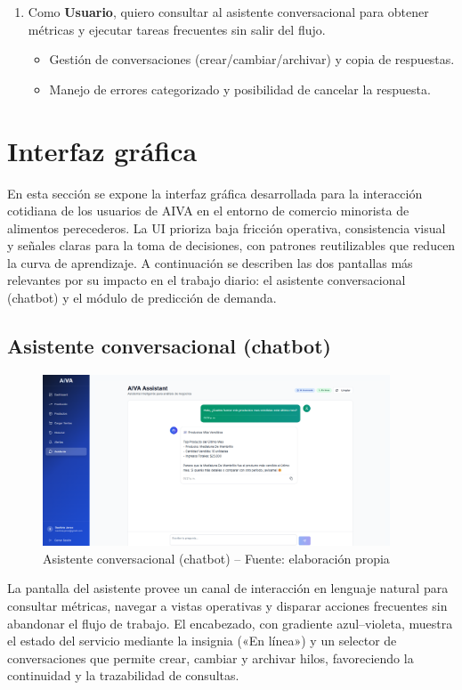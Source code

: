 \begin{enumerate}[label=HU-\arabic*., leftmargin=*, nosep]
\item Como \textbf{Usuario}, quiero consultar al asistente conversacional para obtener métricas y ejecutar tareas frecuentes sin salir del flujo.
\begin{itemize}[nosep]
\item Gestión de conversaciones (crear/cambiar/archivar) y copia de respuestas.
\item Manejo de errores categorizado y posibilidad de cancelar la respuesta.
\end{itemize}


\end{enumerate}


\vspace{1cm}
\section{Interfaz gráfica}
En esta sección se expone la interfaz gráfica desarrollada para la interacción cotidiana de los usuarios de AIVA en el entorno de comercio minorista de alimentos perecederos. La UI prioriza baja fricción operativa, consistencia visual y señales claras para la toma de decisiones, con patrones reutilizables que reducen la curva de aprendizaje. A continuación se describen las dos pantallas más relevantes por su impacto en el trabajo diario: el asistente conversacional (chatbot) y el módulo de predicción de demanda.

\subsection{Asistente conversacional (chatbot)}
\begin{figure}[!htbp]
  \centering
  \includegraphics[width=0.92\textwidth]{images/chatbotPage.png}
  \caption{Asistente conversacional (chatbot) -- Fuente: elaboración propia}
  \label{fig:ui-chatbot}
\end{figure}
La pantalla del asistente provee un canal de interacción en lenguaje natural para consultar métricas, navegar a vistas operativas y disparar acciones frecuentes sin abandonar el flujo de trabajo. El encabezado, con gradiente azul–violeta, muestra el estado del servicio mediante la insignia («En línea») y un selector de conversaciones que permite crear, cambiar y archivar hilos, favoreciendo la continuidad y la trazabilidad de consultas.

